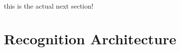 
\yyy this is the actual next section!

\section{Recognition Architecture}
\label{sec:hwre:recognitionarchitecture}




  
   




